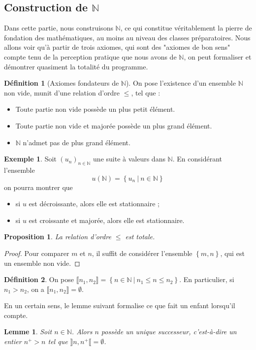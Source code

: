 \documentclass[french]{book}
\newcommand{\N}{\mathbb{N}}
\theoremstyle{plain}
\newtheorem{lem}{Lemme}[chapter]
\newtheorem{prop}{Proposition}[chapter]
\theoremstyle{definition}
\newtheorem{dfn}{Définition}[chapter]
\newtheorem{exa}{Exemple}[chapter]
\theoremstyle{remark}
\begin{document}
\subsection{Construction de $\N$}
Dans cette partie, nous construisons $\N$, ce qui constitue véritablement la pierre de fondation des mathématiques, au moins au niveau des classes préparatoires. Nous allons voir qu'à partir de trois axiomes, qui sont des "axiomes de bon sens" compte tenu de la perception pratique que nous avons de $\N$, on peut formaliser et démontrer quasiment la totalité du programme.
\begin{dfn}[Axiomes fondateurs de $\N$]
	On pose l'existence d'un ensemble $\N$ non vide, munit d'une relation d'ordre $\leqslant$, tel que :
	\begin{itemize}
		\item Toute partie non vide possède un plus petit élément.
		\item Toute partie non vide et majorée possède un plus grand élément.
		\item $\N$ n'admet pas de plus grand élément.
	\end{itemize}
\end{dfn}
\begin{exa}
	Soit $(u_n)_{n\in\N}$ une suite à valeurs dans $\N$. En considérant l'ensemble $$u(\N)=\left\{u_n\ | \ n\in\N\right\}$$ on pourra montrer que 
	\begin{itemize}
		\item si $u$ est décroissante, alors elle est stationnaire ;
		\item si $u$ est croissante et majorée, alors elle est stationnaire.
	\end{itemize}
\end{exa}
\begin{prop}
	La relation d'ordre $\leqslant$ est totale.
\end{prop}
\begin{proof}
	Pour comparer $m$ et $n$, il suffit de considérer l'ensemble $\left\{m,n\right\}$, qui est un ensemble non vide.
\end{proof}
\begin{dfn}
	On pose $\llbracket n_1,n_2\rrbracket=\left\{n\in\N\ | \ n_1\leqslant n\leqslant n_2\right\}$. En particulier, si $n_1>n_2$, on a $\llbracket n_1,n_2\rrbracket=\emptyset$.
\end{dfn}
En un certain sens, le lemme suivant formalise ce que fait un enfant lorsqu'il compte.
\begin{lem}
	Soit $n\in\N$. Alors $n$ possède un unique successeur, c'est-à-dire un entier $n^+>n$ tel que $\rrbracket n,n^+\llbracket=\emptyset$.
\end{lem}
\end{document}

